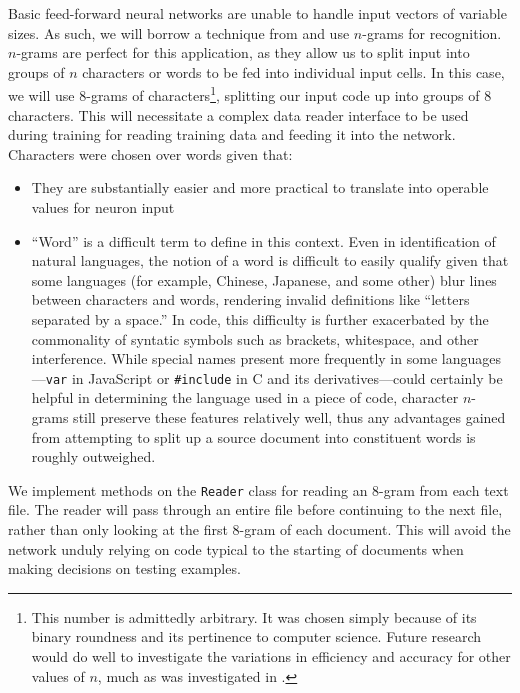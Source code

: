 \documentclass{article}
\begin{document}
Basic feed-forward neural networks are unable to handle input vectors of variable sizes. As such, we will borrow a technique from \cite{langidstanford} and use $n$-grams for recognition. $n$-grams are perfect for this application, as they allow us to split input into groups of $n$ characters or words to be fed into individual input cells. In this case, we will use 8-grams of characters\footnote{This number is admittedly arbitrary. It was chosen simply because of its binary roundness and its pertinence to computer science. Future research would do well to investigate the variations in efficiency and accuracy for other values of $n$, much as was investigated in \cite{langidnn}.}, splitting our input code up into groups of 8 characters. This will necessitate a complex data reader interface to be used during training for reading training data and feeding it into the network. Characters were chosen over words given that:
\begin{itemize}
  \item{They are substantially easier and more practical to translate into operable values for neuron input}
  \item{``Word'' is a difficult term to define in this context. Even in identification of natural languages, the notion of a word is difficult to easily qualify given that some languages (for example, Chinese, Japanese, and some other) blur lines between characters and words, rendering invalid definitions like ``letters separated by a space.'' In code, this difficulty is further exacerbated by the commonality of syntatic symbols such as brackets, whitespace, and other interference. While special names present more frequently in some languages—\texttt{var} in JavaScript or \texttt{\#include} in C and its derivatives—could certainly be helpful in determining the language used in a piece of code, character $n$-grams still preserve these features relatively well, thus any advantages gained from attempting to split up a source document into constituent words is roughly outweighed.}
\end{itemize}

We implement methods on the \texttt{Reader} class for reading an 8-gram from each text file. The reader will pass through an entire file before continuing to the next file, rather than only looking at the first 8-gram of each document. This will avoid the network unduly relying on code typical to the starting of documents when making decisions on testing examples.
\end{document}
